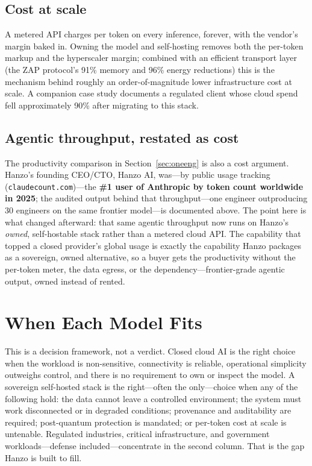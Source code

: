 \documentclass[11pt,letterpaper]{article}
\begin{document}
\subsection{Cost at scale}
A metered API charges per token on every inference, forever, with the vendor's
margin baked in. Owning the model and self-hosting removes both the per-token
markup and the hyperscaler margin; combined with an efficient transport layer
(the ZAP protocol's 91\% memory and 96\% energy reductions) this is the mechanism
behind roughly an order-of-magnitude lower infrastructure cost at scale. A
companion case study documents a regulated client whose cloud spend fell
approximately 90\% after migrating to this stack.

\subsection{Agentic throughput, restated as cost}
The productivity comparison in Section~\ref{sec:oneeng} is also a cost argument. Hanzo's founding
CEO/CTO, Hanzo AI, was---by public usage tracking (\texttt{claudecount.com})---the
\textbf{\#1 user of Anthropic by token count worldwide in 2025}; the audited output
behind that throughput---one engineer outproducing 30 engineers on the
same frontier model---is documented above. The point here is what changed
afterward: that same agentic throughput now runs on Hanzo's \emph{owned},
self-hostable stack rather than a metered cloud API. The capability that topped a
closed provider's global usage is exactly the capability Hanzo packages as a
sovereign, owned alternative, so a buyer gets the productivity without the
per-token meter, the data egress, or the dependency---frontier-grade agentic
output, owned instead of rented.

\section{When Each Model Fits}

This is a decision framework, not a verdict. Closed cloud AI is the right choice
when the workload is non-sensitive, connectivity is reliable, operational
simplicity outweighs control, and there is no requirement to own or inspect the
model. A sovereign self-hosted stack is the right---often the only---choice when
any of the following hold: the data cannot leave a controlled environment; the
system must work disconnected or in degraded conditions; provenance and
auditability are required; post-quantum protection is mandated; or per-token cost
at scale is untenable. Regulated industries, critical infrastructure, and
government workloads---defense included---concentrate in the second
column. That is the gap Hanzo is built to fill.
\end{document}
